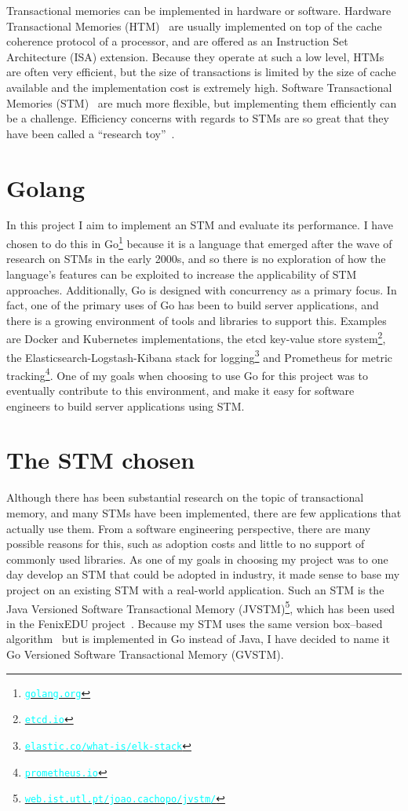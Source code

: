 \documentclass[12pt,a4paper,oneside,openright]{report}
\newcommand{\URL}[1]{\href{https://#1}{\textcolor{cyan}{\texttt{#1}}}}
\begin{document}
Transactional memories can be implemented in hardware or
software. Hardware Transactional Memories (HTM)~\cite{HTM} are usually
implemented on top of the cache coherence protocol of a processor, and
are offered as an Instruction Set Architecture (ISA)
extension. Because they operate at such a low level, HTMs are often
very efficient, but the size of transactions is limited by the size of
cache available and the implementation cost is extremely
high. Software Transactional Memories (STM)~\cite{STM} are much more
flexible, but implementing them efficiently can be a
challenge. Efficiency concerns with regards to STMs are so great that
they have been called a ``research toy''~\cite{Toy}.

\section{Golang}
\label{sec:intro:golang}

In this project I aim to implement an STM and evaluate its
performance. I have chosen to do this in Go\footnote{\URL{golang.org}}
because it is a language that emerged after the wave of research on
STMs in the early 2000s, and so there is no exploration of how the
language's features can be exploited to increase the applicability of
STM approaches. Additionally, Go is designed with concurrency as a
primary focus. In fact, one of the primary uses of Go has been to
build server applications, and there is a growing environment of tools
and libraries to support this. Examples are Docker and Kubernetes
implementations, the etcd key-value store
system\footnote{\URL{etcd.io}}, the Elasticsearch-Logstash-Kibana
stack for logging\footnote{\URL{elastic.co/what-is/elk-stack}} and
Prometheus for metric tracking\footnote{\URL{prometheus.io}}. One of
my goals when choosing to use Go for this project was to eventually
contribute to this environment, and make it easy for software
engineers to build server applications using STM.

\section{The STM chosen}
\label{sec:stm-chosen}

Although there has been substantial research on the topic of
transactional memory, and many STMs have been implemented, there are
few applications that actually use them. From a software engineering
perspective, there are many possible reasons for this, such as
adoption costs and little to no support of commonly used libraries. As
one of my goals in choosing my project was to one day develop an STM
that could be adopted in industry, it made sense to base my project on
an existing STM with a real-world application. Such an STM is the Java
Versioned Software Transactional Memory
(JVSTM)\footnote{\URL{web.ist.utl.pt/joao.cachopo/jvstm/}}, which has
been used in the FenixEDU
project~\cite{carvalho2008versioned}. Because my STM uses the same
version box--based algorithm~\cite{VBox} but is implemented in Go
instead of Java, I have decided to name it Go Versioned Software
Transactional Memory (GVSTM).
\end{document}
